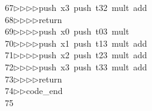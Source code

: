 \begin{tabbing}
67\>$\triangleright$\>$\triangleright$\>$\triangleright$\>$\triangleright$\>push\ x3\ push\ t32\ mult\ add\ \\[0pt]
68\>$\triangleright$\>$\triangleright$\>$\triangleright$\>$\triangleright$\>return\ \\[0pt]
69\>$\triangleright$\>$\triangleright$\>$\triangleright$\>$\triangleright$\>push\ x0\ push\ t03\ mult\ \\[0pt]
70\>$\triangleright$\>$\triangleright$\>$\triangleright$\>$\triangleright$\>push\ x1\ push\ t13\ mult\ add\ \\[0pt]
71\>$\triangleright$\>$\triangleright$\>$\triangleright$\>$\triangleright$\>push\ x2\ push\ t23\ mult\ add\ \\[0pt]
72\>$\triangleright$\>$\triangleright$\>$\triangleright$\>$\triangleright$\>push\ x3\ push\ t33\ mult\ add\ \\[0pt]
73\>$\triangleright$\>$\triangleright$\>$\triangleright$\>$\triangleright$\>return\ \\[0pt]
74\>$\triangleright$\>$\triangleright$\>code\_end\\[0pt]
75\>\end{tabbing}
